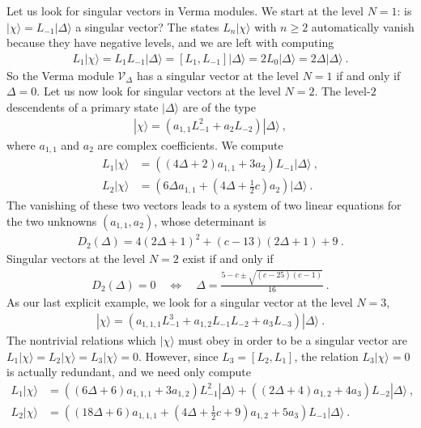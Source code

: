 \documentclass[12pt, a4paper, notitlepage, twoside]{report}
\numberwithin{equation}{section}
\theoremstyle{break}
\begin{document}
Let us look for singular vectors in Verma modules.
We start at the level $N=1$: is $|\chi\rangle=L_{-1}|\Delta\rangle$ a singular vector? The states $L_n|\chi\rangle$ with $n\geq 2$ automatically vanish because they have negative levels, and we are left with computing
\begin{align}
 L_1|\chi\rangle = L_1 L_{-1}|\Delta\rangle = [L_1,L_{-1}]|\Delta\rangle = 2L_0 |\Delta\rangle = 2\Delta|\Delta\rangle\ .
\end{align}
So the Verma module $\mathcal{V}_\Delta$ has a singular vector at the level $N=1$ if and only if $\Delta = 0$.
Let us now look for singular vectors at the level $N=2$.
The level-$2$ descendents of a primary state $|\Delta\rangle$ are of the type
\begin{align}
 |\chi\rangle = \left(a_{1,1} L_{-1}^2 + a_2 L_{-2}\right) |\Delta\rangle\ ,
\end{align}
where $a_{1,1}$ and $a_2$ are complex coefficients.
We compute 
\begin{align}
 L_1|\chi\rangle &= \left((4\Delta+2)a_{1,1} + 3a_2\right) L_{-1}|\Delta\rangle\ ,
\\
L_2 |\chi \rangle &= \left(6\Delta a_{1,1}+(4\Delta+\tfrac12 c) a_2\right)|\Delta\rangle\ .
\end{align}
The vanishing of these two vectors leads to a system of two linear equations for the two unknowns $(a_{1,1},a_2)$, whose determinant is 
\begin{align}
 D_2(\Delta) = 4(2\Delta+1)^2 +(c-13)(2\Delta+1) +9\ . 
\label{dud}
\end{align}
Singular vectors at the level $N=2$ exist if and only if
\begin{align}
D_2(\Delta)=0 \quad \Leftrightarrow \quad \Delta = \frac{5-c\pm \sqrt{(c-25)(c-1)}}{16}\ .
\label{dcscc}
\end{align}
As our last explicit example, we look for a singular vector at the level $N=3$,
\begin{align}
 |\chi\rangle = \left(a_{1,1,1} L_{-1}^3 + a_{1,2}L_{-1}L_{-2} + a_3 L_{-3}\right) |\Delta\rangle\ .
\end{align}
The nontrivial relations which $|\chi\rangle$ must obey in order to be a singular vector are $L_1|\chi\rangle =L_2|\chi\rangle= L_3 |\chi\rangle=0$.
However, since $L_3 = [L_2,L_1]$, the relation $L_3|\chi\rangle=0$ is actually redundant, and we need only compute
\begin{align}
 L_1|\chi\rangle &= \left((6\Delta+6)a_{1,1,1}+3a_{1,2}\right)L_{-1}^2|\Delta\rangle +\left((2\Delta+4)a_{1,2}+4a_3\right)L_{-2}|\Delta\rangle\ ,
\\
L_2|\chi\rangle &= \left((18\Delta+6)a_{1,1,1}+(4\Delta+\tfrac12c +9)a_{1,2}+5a_3\right)L_{-1}|\Delta\rangle\ .
\end{align}
\end{document}
